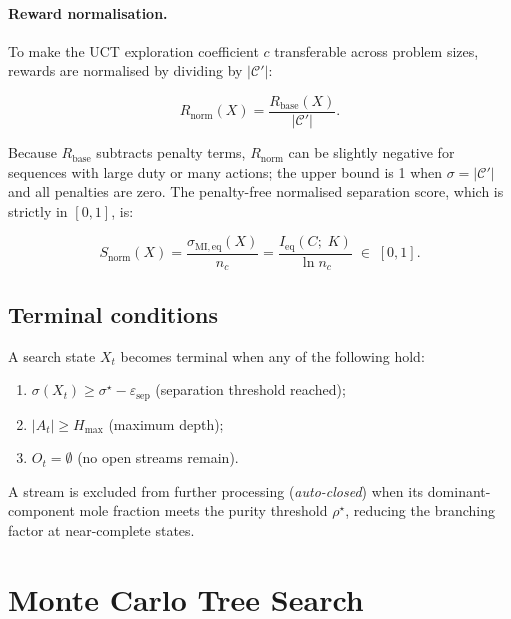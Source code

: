 \documentclass[11pt,a4paper]{article}
\theoremstyle{definition}
\theoremstyle{plain}
\newcommand{\calC}{\mathcal{C}}
\newcommand{\abs}[1]{\left|#1\right|}
\begin{document}
\paragraph{Reward normalisation.}
To make the UCT exploration coefficient $c$ transferable across problem sizes, rewards are normalised by dividing by $\abs{\calC'}$:

\begin{equation}
 R_{\mathrm{norm}}(X)
 = \frac{R_{\mathrm{base}}(X)}{\abs{\calC'}}.
 \label{eq:reward_norm}
\end{equation}

Because $R_{\mathrm{base}}$ subtracts penalty terms, $R_{\mathrm{norm}}$ can be slightly negative for sequences with large duty or many actions; the upper bound is 1 when $\sigma = \abs{\calC'}$ and all penalties are zero. The penalty-free normalised separation score, which is strictly in $[0,1]$, is:

\begin{equation}
 S_{\mathrm{norm}}(X)
 = \frac{\sigma_{\mathrm{MI,eq}}(X)}{n_c}
 = \frac{I_{\mathrm{eq}}(C;\; K)}{\ln n_c}
 \;\in\; [0, 1].
\end{equation}

\subsection{Terminal conditions}
\label{sec:terminal}

A search state $X_t$ becomes terminal when any of the following hold:

\begin{enumerate}[label=(\roman*)]
 \item $\sigma(X_t) \geq \sigma^\star - \varepsilon_{\mathrm{sep}}$
  (separation threshold reached);
 \item $\abs{A_t} \geq H_{\max}$ (maximum depth);
 \item $O_t = \emptyset$ (no open streams remain).
\end{enumerate}

A stream is excluded from further processing (\textit{auto-closed}) when its dominant-component mole fraction meets the purity threshold $\rho^\star$, reducing the branching factor at near-complete states.

\section{Monte Carlo Tree Search}
\label{sec:mcts}
\end{document}
